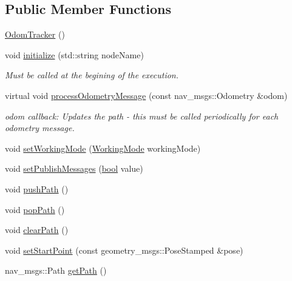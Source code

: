 \subsection*{Public Member Functions}
\begin{DoxyCompactItemize}
\item 
\hyperlink{classsmacc__odom__tracker_1_1OdomTracker_a7d9920de9aa3624896b206da2c28f070}{Odom\+Tracker} ()
\item 
void \hyperlink{classsmacc__odom__tracker_1_1OdomTracker_a4b3ff3f659474cb7bdd6b4b54dcc0a53}{initialize} (std\+::string node\+Name)
\begin{DoxyCompactList}\small\item\em Must be called at the begining of the execution. \end{DoxyCompactList}\item 
virtual void \hyperlink{classsmacc__odom__tracker_1_1OdomTracker_adef7b87ba453ca86886239d875344de1}{process\+Odometry\+Message} (const nav\+\_\+msgs\+::\+Odometry \&odom)
\begin{DoxyCompactList}\small\item\em odom callback\+: Updates the path -\/ this must be called periodically for each odometry message. \end{DoxyCompactList}\item 
void \hyperlink{classsmacc__odom__tracker_1_1OdomTracker_a38fbca999297c46dc95628cc60851a45}{set\+Working\+Mode} (\hyperlink{namespacesmacc__odom__tracker_ade9730dd5cc10ccfad9362176cf46c33}{Working\+Mode} working\+Mode)
\item 
void \hyperlink{classsmacc__odom__tracker_1_1OdomTracker_a5808c41a9d8d75a70ec66fa581af4570}{set\+Publish\+Messages} (\hyperlink{classbool}{bool} value)
\item 
void \hyperlink{classsmacc__odom__tracker_1_1OdomTracker_a01194bc1bd8095929c61fc912a44e534}{push\+Path} ()
\item 
void \hyperlink{classsmacc__odom__tracker_1_1OdomTracker_a915623e872cc34912c8d50cffd9551f2}{pop\+Path} ()
\item 
void \hyperlink{classsmacc__odom__tracker_1_1OdomTracker_a81ef228f0c2659e1bf9f8fdcb03fc7ae}{clear\+Path} ()
\item 
void \hyperlink{classsmacc__odom__tracker_1_1OdomTracker_a5ac7c4770b3e29b74571ef65377048ee}{set\+Start\+Point} (const geometry\+\_\+msgs\+::\+Pose\+Stamped \&pose)
\item 
nav\+\_\+msgs\+::\+Path \hyperlink{classsmacc__odom__tracker_1_1OdomTracker_ace0762f93bc272a426d3038f74dc8752}{get\+Path} ()
\end{DoxyCompactItemize}
